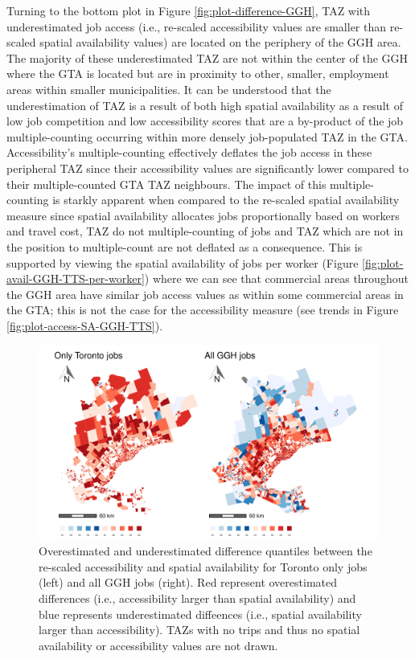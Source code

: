 \documentclass[]{elsarticle} %
\begin{document}
Turning to the bottom plot in Figure \ref{fig:plot-difference-GGH}, TAZ
with underestimated job access (i.e., re-scaled accessibility values are
smaller than re-scaled spatial availability values) are located on the
periphery of the GGH area. The majority of these underestimated TAZ are
not within the center of the GGH where the GTA is located but are in
proximity to other, smaller, employment areas within smaller
municipalities. It can be understood that the underestimation of TAZ is
a result of both high spatial availability as a result of low job
competition and low accessibility scores that are a by-product of the
job multiple-counting occurring within more densely job-populated TAZ in
the GTA. Accessibility's multiple-counting effectively deflates the job
access in these peripheral TAZ since their accessibility values are
significantly lower compared to their multiple-counted GTA TAZ
neighbours. The impact of this multiple-counting is starkly apparent
when compared to the re-scaled spatial availability measure since
spatial availability allocates jobs proportionally based on workers and
travel cost, TAZ do not multiple-counting of jobs and TAZ which are not
in the position to multiple-count are not deflated as a consequence.
This is supported by viewing the spatial availability of jobs per worker
(Figure \ref{fig:plot-avail-GGH-TTS-per-worker}) where we can see that
commercial areas throughout the GGH area have similar job access values
as within some commercial areas in the GTA; this is not the case for the
accessibility measure (see trends in Figure
\ref{fig:plot-access-SA-GGH-TTS}).

\begin{figure}

{\centering \includegraphics[width=1\linewidth]{Spatial-Availability_files/figure-latex/plot-diff-Toronto-vs-GGH-1} 

}

\caption{\label{fig:plot-diff-Toronto-vs-GGH}Overestimated and underestimated difference quantiles between the re-scaled accessibility and spatial availability for Toronto only jobs (left) and all GGH jobs (right). Red represent overestimated differences (i.e., accessibility larger than spatial availability) and blue represents underestimated diffeences (i.e., spatial availability larger than accessibility). TAZs with no trips and thus no spatial availability or accessibility values are not drawn.}\label{fig:plot-diff-Toronto-vs-GGH}
\end{figure}
\end{document}
